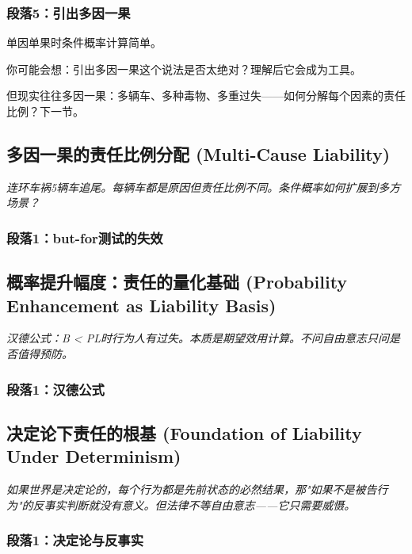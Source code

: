 \documentclass[a4paper,12pt]{book}
\newenvironment{motivation}{\begin{tcolorbox}[colback=gray!10,colframe=gray!60,title=\textit{动机}]\small\itshape}{\end{tcolorbox}}
\begin{document}
\begin{motivation}
\begin{motivation}
\begin{motivation}
	\subsubsection*{段落5：引出多因一果}
	单因单果时条件概率计算简单。
	\begin{tcolorbox}[colback=yellow!5, title=\textit{读者行为预测}]
		你可能会想：引出多因一果这个说法是否太绝对？理解后它会成为工具。
	\end{tcolorbox}

但现实往往多因一果：多辆车、多种毒物、多重过失——如何分解每个因素的责任比例？下一节。

	\subsection{多因一果的责任比例分配 (Multi-Cause Liability)}
	\begin{motivation}
		连环车祸5辆车追尾。每辆车都是原因但责任比例不同。条件概率如何扩展到多方场景？
	\end{motivation}
	\subsubsection*{段落1：but-for测试的失效}

	\subsection{概率提升幅度：责任的量化基础 (Probability Enhancement as Liability Basis)}
	\begin{motivation}
		汉德公式：B < PL时行为人有过失。本质是期望效用计算。不问自由意志只问是否值得预防。\end{motivation}
	\subsubsection*{段落1：汉德公式}

	\subsection{决定论下责任的根基 (Foundation of Liability Under Determinism)}
	\begin{motivation}如果世界是决定论的，每个行为都是先前状态的必然结果，那"如果不是被告行为"的反事实判断就没有意义。但法律不等自由意志——它只需要威慑。
	\end{motivation}
	\subsubsection*{段落1：决定论与反事实}


\end{motivation}
\end{motivation}
\end{motivation}
\end{document}
